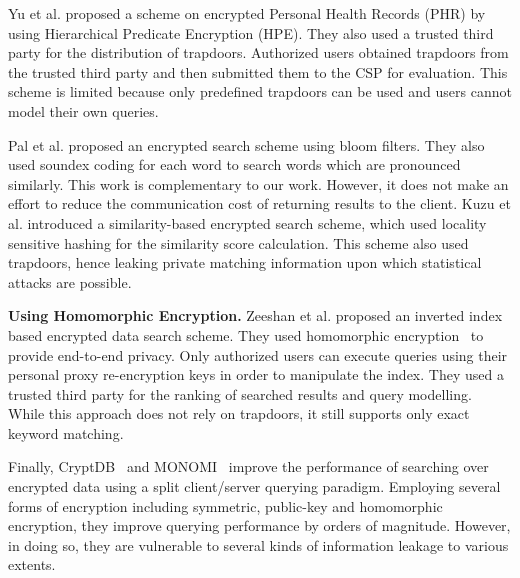 Yu et al. \cite{li} proposed a scheme on encrypted Personal Health Records
(PHR) by using Hierarchical Predicate Encryption (HPE). They also used a 
trusted third party for the distribution of trapdoors. 
Authorized users obtained trapdoors from the trusted third party and then 
submitted them to the CSP for evaluation. This scheme is limited because only 
predefined trapdoors can be used and users cannot model their own queries.

Pal et al. \cite{saibal} proposed an encrypted search scheme using bloom filters. They
also used soundex coding\cite{odell1918soundex} for each word to search words
which are pronounced similarly. This work is complementary to our work. However, it
does not make an effort to reduce the communication cost of returning results to the
client. Kuzu et al.\cite{mehmat} introduced a similarity-based encrypted search scheme,
which used locality sensitive hashing for the similarity score calculation.
This scheme also used trapdoors, hence leaking private matching information
upon which statistical attacks are possible. 


\textbf{Using Homomorphic Encryption.}
Zeeshan et al.\cite{zeehan} proposed an inverted index based encrypted data search scheme.
They used homomorphic encryption~\cite{craig} to provide end-to-end privacy. Only
authorized users can execute queries using their personal proxy re-encryption keys in
order to manipulate the index. They used a trusted third party for the ranking of searched results and
query modelling. While this approach does not rely on trapdoors, it still supports only
exact keyword matching.

Finally, CryptDB~\cite{popa2011cryptdb} and MONOMI~\cite{tu2013processing} improve the performance of searching over encrypted data using
a split client/server querying paradigm. Employing several forms of encryption including
symmetric, public-key and homomorphic encryption, they improve querying performance by orders
of magnitude. However, in doing so, they are vulnerable to several kinds of information leakage to various extents.
